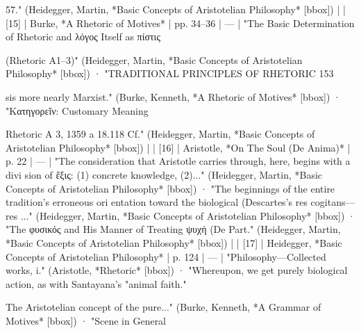 57." (Heidegger, Martin, *Basic Concepts of Aristotelian Philosophy* [bbox]) |
| [15] | Burke, *A Rhetoric of Motives* | pp. 34–36 | — | "The Basic Determination of Rhetoric and λόγος Itself as πίστις

(Rhetoric Α1–3)" (Heidegger, Martin, *Basic Concepts of Aristotelian Philosophy* [bbox]) · "TRADITIONAL PRINCIPLES OF RHETORIC 153

sis more nearly Marxist." (Burke, Kenneth, *A Rhetoric of Motives* [bbox]) · "Κατηγορεῖν: Customary Meaning

Rhetoric A 3, 1359 a 18.118 Cf." (Heidegger, Martin, *Basic Concepts of Aristotelian Philosophy* [bbox]) |
| [16] | Aristotle, *On The Soul (De Anima)* | p. 22 | — | "The consideration that Aristotle carries through, here, begins with a divi­ sion of ἕξις: (1) concrete knowledge, (2)..." (Heidegger, Martin, *Basic Concepts of Aristotelian Philosophy* [bbox]) · "The beginnings of the entire tradition’s erroneous ori­ entation toward the biological (Descartes’s res cogitans—res ..." (Heidegger, Martin, *Basic Concepts of Aristotelian Philosophy* [bbox]) · "The φυσικός and His Manner of Treating ψυχή (De Part." (Heidegger, Martin, *Basic Concepts of Aristotelian Philosophy* [bbox]) |
| [17] | Heidegger, *Basic Concepts of Aristotelian Philosophy* | p. 124 | — | "Philosophy—Collected works, i." (Aristotle, *Rhetoric* [bbox]) · "Whereupon, we get purely biological action, as with Santayana's "animal faith."

The Aristotelian concept of the pure..." (Burke, Kenneth, *A Grammar of Motives* [bbox]) · "Scene in General

